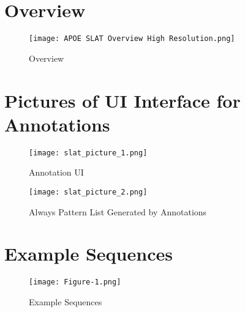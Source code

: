 \documentclass[pmlr,twocolumn,10pt]{jmlr} %
\begin{document}
\clearpage



\nocite{*}

\clearpage

\appendix

\section{Overview}
\begin{figure}[h] \label{app:overview}
\centering 
\texttt{[image: APOE SLAT Overview High Resolution.png]}
\caption{Overview}

\end{figure}

\clearpage

\section{Pictures of UI Interface for Annotations} 
\label{app:slat}
\begin{figure}[h]
\centering 
\texttt{[image: slat\_picture\_1.png]}
\caption{Annotation UI}
\end{figure}

\begin{figure}[h]
\centering 
\texttt{[image: slat\_picture\_2.png]}
\caption{Always Pattern List Generated by Annotations}
\end{figure}

\clearpage

\section{Example Sequences} 
\begin{figure}[h!] \label{app:examples}
\centering 
\texttt{[image: Figure-1.png]}
\caption{Example Sequences}
\end{figure}

\clearpage

\end{document}
